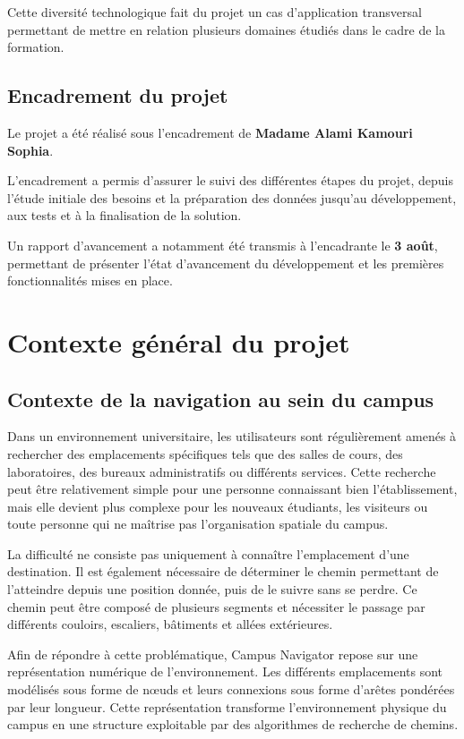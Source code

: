 \documentclass[12pt,a4paper]{report}
\begin{document}
Cette diversité technologique fait du projet un cas d'application transversal permettant de
mettre en relation plusieurs domaines étudiés dans le cadre de la formation.

\subsection{Encadrement du projet}

Le projet a été réalisé sous l'encadrement de \textbf{Madame Alami Kamouri Sophia}.

L'encadrement a permis d'assurer le suivi des différentes étapes du projet, depuis l'étude
initiale des besoins et la préparation des données jusqu'au développement, aux tests et à la
finalisation de la solution.

Un rapport d'avancement a notamment été transmis à l'encadrante le \textbf{3 août}, permettant de
présenter l'état d'avancement du développement et les premières fonctionnalités mises en place.

\section{Contexte général du projet}

\subsection{Contexte de la navigation au sein du campus}

Dans un environnement universitaire, les utilisateurs sont régulièrement amenés à rechercher des
emplacements spécifiques tels que des salles de cours, des laboratoires, des bureaux
administratifs ou différents services. Cette recherche peut être relativement simple pour une
personne connaissant bien l'établissement, mais elle devient plus complexe pour les nouveaux
étudiants, les visiteurs ou toute personne qui ne maîtrise pas l'organisation spatiale du campus.

La difficulté ne consiste pas uniquement à connaître l'emplacement d'une destination. Il est
également nécessaire de déterminer le chemin permettant de l'atteindre depuis une position
donnée, puis de le suivre sans se perdre. Ce chemin peut être composé de plusieurs segments et
nécessiter le passage par différents couloirs, escaliers, bâtiments et allées extérieures.

Afin de répondre à cette problématique, Campus Navigator repose sur une représentation numérique
de l'environnement. Les différents emplacements sont modélisés sous forme de nœuds et leurs
connexions sous forme d'arêtes pondérées par leur longueur. Cette représentation transforme
l'environnement physique du campus en une structure exploitable par des algorithmes de recherche
de chemins.
\end{document}
